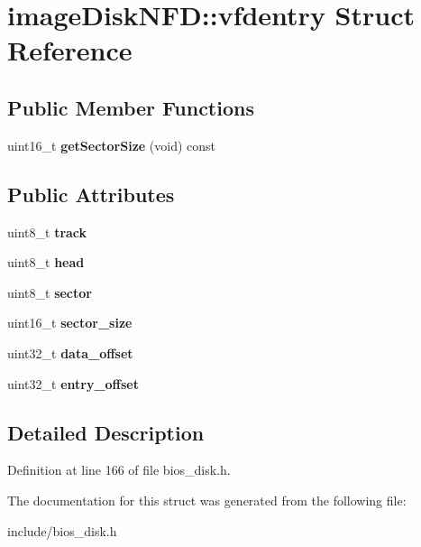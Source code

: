 \hypertarget{structimageDiskNFD_1_1vfdentry}{\section{image\-Disk\-N\-F\-D\-:\-:vfdentry Struct Reference}
\label{structimageDiskNFD_1_1vfdentry}
}
\subsection*{Public Member Functions}
\begin{DoxyCompactItemize}
\item 
\hypertarget{structimageDiskNFD_1_1vfdentry_a12bf8e217dd12b933e9e508d3d1d2115}{uint16\-\_\-t {\bfseries get\-Sector\-Size} (void) const }\label{structimageDiskNFD_1_1vfdentry_a12bf8e217dd12b933e9e508d3d1d2115}

\end{DoxyCompactItemize}
\subsection*{Public Attributes}
\begin{DoxyCompactItemize}
\item 
\hypertarget{structimageDiskNFD_1_1vfdentry_aead7c9ba94160f13dcf012c7adf5b8ef}{uint8\-\_\-t {\bfseries track}}\label{structimageDiskNFD_1_1vfdentry_aead7c9ba94160f13dcf012c7adf5b8ef}

\item 
\hypertarget{structimageDiskNFD_1_1vfdentry_a132e27d1df33c47c37235e7958e3301d}{uint8\-\_\-t {\bfseries head}}\label{structimageDiskNFD_1_1vfdentry_a132e27d1df33c47c37235e7958e3301d}

\item 
\hypertarget{structimageDiskNFD_1_1vfdentry_affe7d792cd3b0d3cf2ec1578a0858541}{uint8\-\_\-t {\bfseries sector}}\label{structimageDiskNFD_1_1vfdentry_affe7d792cd3b0d3cf2ec1578a0858541}

\item 
\hypertarget{structimageDiskNFD_1_1vfdentry_a6e26dac70e9c36939eede2b5540e120a}{uint16\-\_\-t {\bfseries sector\-\_\-size}}\label{structimageDiskNFD_1_1vfdentry_a6e26dac70e9c36939eede2b5540e120a}

\item 
\hypertarget{structimageDiskNFD_1_1vfdentry_a47065ee2a3e3c590c6617e5855d054f8}{uint32\-\_\-t {\bfseries data\-\_\-offset}}\label{structimageDiskNFD_1_1vfdentry_a47065ee2a3e3c590c6617e5855d054f8}

\item 
\hypertarget{structimageDiskNFD_1_1vfdentry_a17429a540fce1558b87fcc735f56c88f}{uint32\-\_\-t {\bfseries entry\-\_\-offset}}\label{structimageDiskNFD_1_1vfdentry_a17429a540fce1558b87fcc735f56c88f}

\end{DoxyCompactItemize}


\subsection{Detailed Description}


Definition at line 166 of file bios\-\_\-disk.\-h.



The documentation for this struct was generated from the following file\-:\begin{DoxyCompactItemize}
\item 
include/bios\-\_\-disk.\-h\end{DoxyCompactItemize}
